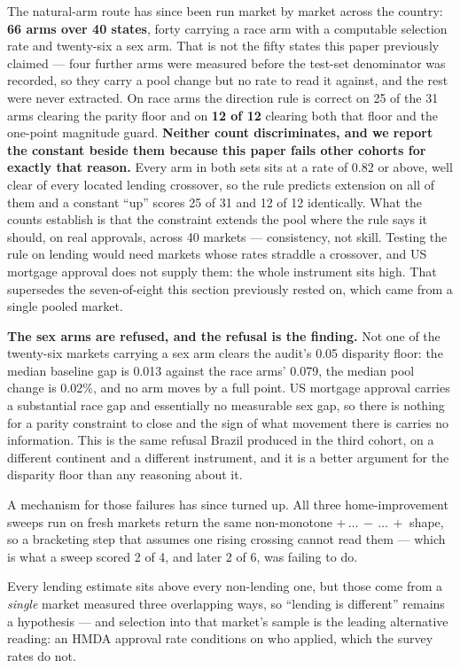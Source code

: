 \documentclass[9pt,conference]{IEEEtran}
\begin{document}
The natural-arm route has since been run market by market across the country:
\textbf{66 arms over 40 states}, forty carrying a race arm with a computable selection rate
and twenty-six a sex arm. That is not the fifty states this paper previously claimed --- four
further arms were measured before the test-set denominator was recorded, so they carry a pool
change but no rate to read it against, and the rest were never extracted. On race arms the direction rule is correct on 25 of the 31 arms clearing the parity floor
and on \textbf{12 of 12} clearing both that floor and the one-point magnitude guard.
\textbf{Neither count discriminates, and we report the constant beside them because this
paper fails other cohorts for exactly that reason.} Every arm in both sets sits at a rate of
0.82 or above, well clear of every located lending crossover, so the rule predicts extension
on all of them and a constant ``up'' scores 25 of 31 and 12 of 12 identically. What the
counts establish is that the constraint extends the pool where the rule says it should, on
real approvals, across 40 markets --- consistency, not skill. Testing the rule on lending
would need markets whose rates straddle a crossover, and US mortgage approval does not
supply them: the whole instrument sits high. That supersedes the seven-of-eight this section previously rested
on, which came from a single pooled market.

\textbf{The sex arms are refused, and the refusal is the finding.} Not one of the twenty-six
markets carrying a sex arm clears the audit's 0.05 disparity floor: the median baseline gap
is 0.013 against the race arms' 0.079, the median pool change is 0.02\%, and no arm moves by
a full point. US mortgage approval carries a substantial race gap and essentially no
measurable sex gap, so there is nothing for a parity constraint to close and the sign of what
movement there is carries no information. This is the same refusal Brazil produced in the
third cohort, on a different continent and a different instrument, and it is a better
argument for the disparity floor than any reasoning about it.

A mechanism for those failures has since turned up. All three home-improvement sweeps run
on fresh markets return the same non-monotone \mbox{$+\,\ldots\,-\,\ldots\,+$} shape, so a
bracketing step that assumes one rising crossing cannot read them --- which is what a sweep
scored 2 of 4, and later 2 of 6, was failing to do.

Every lending estimate sits above every non-lending one, but those come from a \emph{single}
market measured three overlapping ways, so ``lending is different'' remains a hypothesis
--- and selection into that market's sample is the leading alternative reading: an HMDA
approval rate conditions on who applied, which the survey rates do not.
\end{document}
